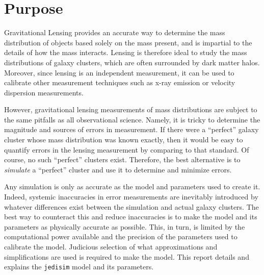 \documentclass[10pt,twoside]{article}
\theoremstyle{definition}
\theoremstyle{exercise}
\begin{document}
\section{Purpose}

  Gravitational Lensing provides an accurate way to determine the mass distribution of objects based solely on the mass present, and is impartial to the details of how the mass interacts. Lensing is therefore ideal to study the mass distributions of galaxy clusters, which are often surrounded by dark matter halos. Moreover, since lensing is an independent measurement, it can be used to calibrate other measurement techniques such as x-ray emission or velocity dispersion measurements.  

  However, gravitational lensing measurements of mass distributions are subject to the same pitfalls as all observational science. Namely, it is tricky to determine the magnitude and sources of errors in measurement. If there were a ``perfect'' galaxy cluster whose mass distribution was known exactly, then it would be easy to quantify errors in the lensing measurement by comparing to that standard. Of course, no such ``perfect'' clusters exist. Therefore, the best alternative is to \textit{simulate} a ``perfect'' cluster and use it to determine and minimize errors.

  Any simulation is only as accurate as the model and parameters used to create it. Indeed, systemic inaccuracies in error measurements are inevitably introduced by whatever differences exist between the simulation and actual galaxy clusters. The best way to counteract this and reduce inaccuracies is to make the model and its parameters as physically accurate as possible. This, in turn, is limited by the computational power available and the precision of the parameters used to calibrate the model. Judicious selection of what approximations and simplifications are used is required to make the model. This report details and explains the \texttt{jedisim} model and its parameters.
\end{document}
